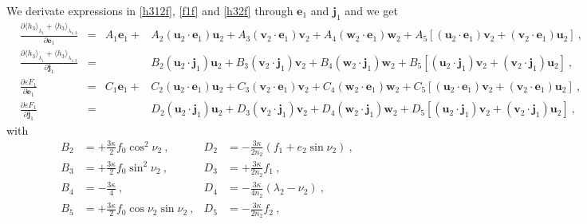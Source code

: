 \documentclass[a4paper]{article}
\begin{document}
We derivate expressions in \eqref{h312f}, \eqref{f1f} and \eqref{h32f} through $\mathbf e_{1}$ and $\mathbf j_{1}$ and we get
\begin{align}
&\frac{\partial  \langle h_{3} \rangle _{\lambda_{1}} +  \langle h_{3} \rangle _{\lambda_{1,2}}} {\partial \mathbf e_{1}}
&=& A_{1}\mathbf e_{1}
+&A_{2}(\mathbf u_{2} \cdot \mathbf e_{1})\mathbf u_{2}
+A_{3}(\mathbf v_{2} \cdot \mathbf e_{1}) \mathbf v_{2} 
+A_{4}(\mathbf w_{2} \cdot \mathbf e_{1}) \mathbf w_{2} 
+A_{5} \left[ (\mathbf u_{2} \cdot \mathbf e_{1})\mathbf v_{2} +(\mathbf v_{2} \cdot \mathbf e_{1}) \mathbf u_{2} \right] \ , \\
&\frac{\partial  \langle h_{3} \rangle _{\lambda_{1}} +  \langle h_{3} \rangle _{\lambda_{1,2}}} {\partial \mathbf j_{1}}
&=& &B_{2}(\mathbf u_{2} \cdot \mathbf j_{1})\mathbf u_{2}
+B_{3}(\mathbf v_{2} \cdot \mathbf j_{1}) \mathbf v_{2} 
+B_{4}(\mathbf w_{2} \cdot \mathbf j_{1}) \mathbf w_{2} 
+B_{5} \left[ (\mathbf u_{2} \cdot \mathbf j_{1})\mathbf v_{2} +(\mathbf v_{2} \cdot \mathbf j_{1}) \mathbf u_{2} \right] \ , \\
&\frac{\partial \varepsilon F_{1}} {\partial \mathbf e_{1}}
&=& C_{1}\mathbf e_{1}
+&C_{2}(\mathbf u_{2} \cdot \mathbf e_{1})\mathbf u_{2}
+C_{3}(\mathbf v_{2} \cdot \mathbf e_{1}) \mathbf v_{2} 
+C_{4}(\mathbf w_{2} \cdot \mathbf e_{1}) \mathbf w_{2} 
+C_{5} \left[ (\mathbf u_{2} \cdot \mathbf e_{1})\mathbf v_{2} +(\mathbf v_{2} \cdot \mathbf e_{1}) \mathbf u_{2} \right] \ , \\
&\frac{\partial \varepsilon F_{1}} {\partial \mathbf j_{1}}
&=& &D_{2}(\mathbf u_{2} \cdot \mathbf j_{1})\mathbf u_{2}
+D_{3}(\mathbf v_{2} \cdot \mathbf j_{1}) \mathbf v_{2} 
+D_{4}(\mathbf w_{2} \cdot \mathbf j_{1}) \mathbf w_{2} 
+D_{5} \left[ (\mathbf u_{2} \cdot \mathbf j_{1})\mathbf v_{2} +(\mathbf v_{2} \cdot \mathbf j_{1}) \mathbf u_{2} \right] \ ,
\end{align}
with
\begin{align}
B_{2}&=+\frac{3 \kappa}{2} f_{0} \cos^{2}{\nu_{2}} \ ,
&D_{2}&=-\frac{3 \kappa}{2n_{2}}(f_{1}+e_{2}\sin{\nu_{2}}) \ , \\
B_{3}&=+\frac{3 \kappa}{2} f_{0} \sin^{2}{\nu_{2}} \ ,
&D_{3}&=+\frac{3 \kappa}{2n_{2}}f_{1}  \ , \\
B_{4}&=-\frac{3 \kappa}{4} \ , 
&D_{4}&= -\frac{3 \kappa}{4 n_{2}}(\lambda_{2}-\nu_{2}) \ , \\
B_{5}&=+\frac{3 \kappa}{2}f_{0} \cos{\nu_{2}} \sin{\nu_{2}} \ , 
&D_{5}&=-\frac{3 \kappa}{2n_{2}}f_{2}  \ ,
\end{align}
\end{document}
